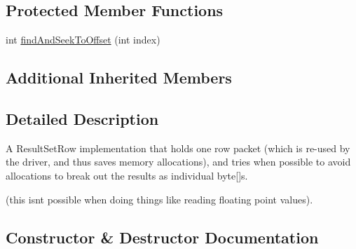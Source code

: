 \subsection*{Protected Member Functions}
\begin{DoxyCompactItemize}
\item 
int \mbox{\hyperlink{classcom_1_1mysql_1_1cj_1_1protocol_1_1a_1_1result_1_1_text_buffer_row_a3d450230d8439eb5e1462b9f75b2714c}{find\+And\+Seek\+To\+Offset}} (int index)
\end{DoxyCompactItemize}
\subsection*{Additional Inherited Members}


\subsection{Detailed Description}
A Result\+Set\+Row implementation that holds one row packet (which is re-\/used by the driver, and thus saves memory allocations), and tries when possible to avoid allocations to break out the results as individual byte\mbox{[}\mbox{]}s.

(this isn\textquotesingle{}t possible when doing things like reading floating point values). 

\subsection{Constructor \& Destructor Documentation}
\mbox{\label{classcom_1_1mysql_1_1cj_1_1protocol_1_1a_1_1result_1_1_text_buffer_row_aa8590ac608223c7b5411e9a43fa8a40e}} 
